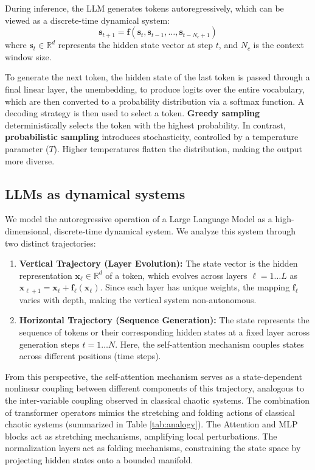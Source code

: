\documentclass[a4paper,12pt]{article}
\begin{document}
    During inference, the LLM generates tokens autoregressively, which can be viewed as a discrete-time dynamical system:
    \begin{equation}
        \mathbf{s}_{t+1} = \mathbf{f}(\mathbf{s}_t, \mathbf{s}_{t-1}, \dots, \mathbf{s}_{t-N_c+1})
    \end{equation}
    where $\mathbf{s}_t \in \mathbb{R}^d$ represents the hidden state vector at step $t$, and $N_c$ is the context window size. 

    To generate the next token, the hidden state of the last token is passed through a final linear layer, the unembedding, to produce logits over the entire vocabulary, which are then converted to a probability distribution via a softmax function. A decoding strategy is then used to select a token. \textbf{Greedy sampling} deterministically selects the token with the highest probability. In contrast, \textbf{probabilistic sampling} introduces stochasticity, controlled by a temperature parameter ($T$). Higher temperatures flatten the distribution, making the output more diverse.


    \subsection{LLMs as dynamical systems}
    \label{subsec:analogy_limitations}
    We model the autoregressive operation of a Large Language Model as a high-dimensional, discrete-time dynamical system. We analyze this system through two distinct trajectories:

    \begin{enumerate}
        \item \textbf{Vertical Trajectory (Layer Evolution):} The state vector is the hidden representation $\mathbf{x}_\ell \in \mathbb{R}^d$ of a token, which evolves across layers $\ell = 1 \dots L$ as $\mathbf{x}_{\ell+1} = \mathbf{x}_\ell + \mathbf{f}_\ell(\mathbf{x}_\ell)$. Since each layer has unique weights, the mapping $\mathbf{f}_\ell$ varies with depth, making the vertical system non-autonomous.
        \item \textbf{Horizontal Trajectory (Sequence Generation):} The state represents the sequence of tokens or their corresponding hidden states at a fixed layer across generation steps $t = 1 \dots N$. Here, the self-attention mechanism couples states across different positions (time steps).
    \end{enumerate}

    From this perspective, the self-attention mechanism serves as a state-dependent nonlinear coupling between different components of this trajectory, analogous to the inter-variable coupling observed in classical chaotic systems. The combination of transformer operators mimics the stretching and folding actions of classical chaotic systems (summarized in Table \ref{tab:analogy}). The Attention and MLP blocks act as stretching mechanisms, amplifying local perturbations. The normalization layers act as folding mechanisms, constraining the state space by projecting hidden states onto a bounded manifold.
\end{document}
